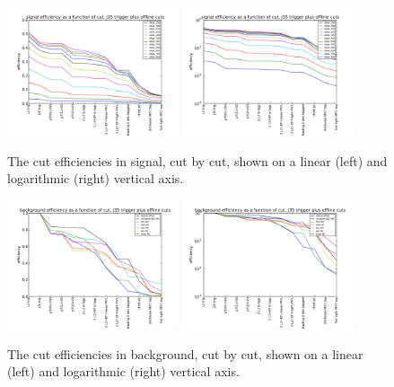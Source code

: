 \begin{figure}
    \center
	\includegraphics[width=0.45\textwidth]{TriggerCuts/cut_efficiencies_j35_signal.pdf}	
	\includegraphics[width=0.45\textwidth]{TriggerCuts/cut_efficiencies_logy_j35_signal.pdf}	
    \caption{The cut efficiencies in signal, cut by cut, shown on a linear (left) and logarithmic (right) vertical axis. \label{fig:signal_eff_cutflow}}
\end{figure}






\begin{figure}
    \center
	\includegraphics[width=0.45\textwidth]{TriggerCuts/cut_efficiencies_j35_background.pdf}	
	\includegraphics[width=0.45\textwidth]{TriggerCuts/cut_efficiencies_logy_j35_background.pdf}	
    \caption{The cut efficiencies in background, cut by cut, shown on a linear (left) and logarithmic (right) vertical axis. \label{fig:background_eff_cutflow}}
\end{figure}

